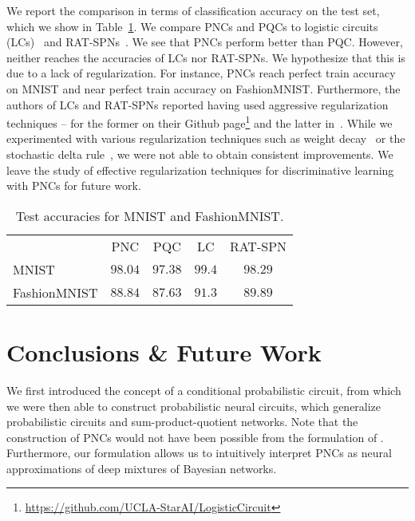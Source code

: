 \documentclass[letterpaper]{article} %
\begin{document}
We report the comparison in terms of classification accuracy on the test set, which we show in Table~\ref{tab:discrim}. We compare PNCs and PQCs to logistic circuits (LCs)~\citep{liang2019learning} and RAT-SPNs~. We see that PNCs perform better than PQC. However, neither reaches the accuracies of LCs nor RAT-SPNs. We hypothesize that this is due to a lack of regularization. For instance, PNCs reach perfect train accuracy on MNIST and near perfect train accuracy on FashionMNIST.
Furthermore, the authors of LCs and RAT-SPNs reported having used aggressive regularization techniques -- for the former on their Github page\footnote{\url{https://github.com/UCLA-StarAI/LogisticCircuit}} and the latter in~.
While we experimented with various regularization techniques such as weight decay~ or the stochastic delta rule~\citep{hanson1990stochastic}, we were not able to obtain consistent improvements. We leave the study of effective regularization techniques for discriminative learning with PNCs for future work.









\begin{table}[t]
    \footnotesize
    \centering
    \begin{tabular}{lcccc}
                     & PNC     & PQC     & LC     & RAT-SPN  \\
        \cmidrule(lr){2-3}
        \cmidrule(lr){4-5}
        MNIST        & $98.04$ & $97.38$ & $99.4$ & $98.29$  \\
        FashionMNIST & $88.84$ & $87.63$ & $91.3$ & $89.89 $ \\
    \end{tabular}
    \caption{Test accuracies for MNIST and FashionMNIST.}
    \label{tab:discrim}
\end{table}



\section{Conclusions \& Future Work}


We first introduced the concept of a conditional probabilistic circuit, from which we were then able to construct probabilistic neural circuits, which generalize probabilistic circuits and sum-product-quotient networks. Note that the construction of PNCs would not have been possible from the formulation of \citet{sharir2018sum}. Furthermore, our formulation allows us to intuitively interpret PNCs as neural approximations of deep mixtures of Bayesian networks.
\end{document}
